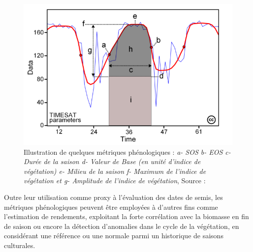 \begin{figure}[htbp]
 \begin{center}
  \includegraphics[scale=0.45]{synthese_biblio/metrics.png} 
 \end{center}
 \caption[Illustration de quelques métriques phénologiques]{Illustration de quelques métriques phénologiques : \emph{a- SOS b- EOS c- Durée de la saison d- Valeur de Base (en unité d'indice de végétation) e- Milieu de la saison f- Maximum de l'indice de végétation et g- Amplitude de l'indice de végétation}, Source : \citet{Eklundh2017}}
 \label{metrics}
\end{figure}

Outre leur utilisation comme proxy à l'évaluation des dates de semis, les métriques phénologiques peuvent être employées à d'autres fins comme l'estimation de rendements, exploitant 
la forte corrélation avec la biomasse en fin de saison ou encore la détection d'anomalies dans le cycle de la végétation, en considérant une référence ou une normale parmi un 
historique de saisons culturales.

\vspace{5mm}

